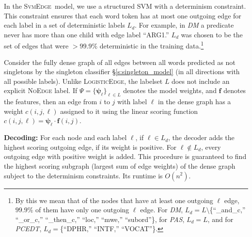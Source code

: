 \documentclass[11pt]{article}
\DeclareMathOperator*{\argmax}{arg\,max}
\newcommand{\logitedge}{\textsc{LogisticEdge}}
\newcommand{\svmedge}{\textsc{SvmEdge}}
\begin{document}
In the \svmedge~model, we use a structured SVM
with a determinism constraint.
This constraint ensures that each word token has at most one outgoing edge for
each label in a set of deterministic labels $L_d$.
For example, in \emph{DM} a predicate never has more than one child with edge
label ``ARG1.''
 $L_d$ was chosen to be the set of edges that were $> 99.9\%$
deterministic in the training data.\footnote{
By this we mean that of the nodes that have at least one
outgoing $\ell$ edge, $99.9\%$ of them have only one outgoing $\ell$ edge.
For \emph{DM}, $L_d=L \setminus$\{``\_and\_c,'' ``\_or\_c,'' ``\_then\_c,'' ``loc,'' ``mwe,'' ``subord''\},
for \emph{PAS}, $L_d = L$, and for \emph{PCEDT},
$L_d=$\{``DPHR,'' ``INTF,''  ``VOCAT''\}.}

Consider the fully dense graph of all edges between all words predicted
as not singletons by the singleton classifier \S\ref{s:singleton_model} (in all
directions with all possible labels). Unlike \logitedge, the labelset $L$ does not 
include an explicit \textsc{NoEdge} label.
If $\Psi = \{\bm\psi_\ell\}_{\ell \in L}$ denotes the model
weights, and $\bm{f}$ denotes the features, then an edge from $i$ to $j$ with
label $\ell$ in the dense graph has a weight $c(i,j,\ell)$ assigned to it using the linear
scoring function $c(i,j,\ell) = \bm\psi_\ell \cdot \bm{f}(i,j)$.

\textbf{Decoding:} For each node and each label $\ell$, if $\ell \in L_d$, the
decoder adds the highest scoring outgoing edge, if its weight is positive.
For $\ell \not\in L_d$, every outgoing edge with positive weight is added.
This procedure is guaranteed to find the highest scoring subgraph (largest sum
of edge weights) of the dense graph subject to the determinism constraints.
Its runtime is $O(n^2)$.
\end{document}
